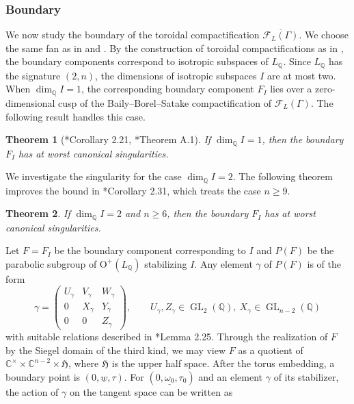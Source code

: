 \documentclass[11pt]{amsart}
\theoremstyle{plain}
\newtheorem{thm}{Theorem}[section]
\theoremstyle{definition}
\numberwithin{equation}{section}
\def\GL{\mathop{\mathrm{GL}}\nolimits}
\def\dim{\mathop{\mathrm{dim}}\nolimits}
\def\O{\mathrm{O}}
\newcommand{\bbC}{\mathbb{C}}
\newcommand{\bbQ}{\mathbb{Q}}
\newcommand{\calF}{\mathcal{F}}
\newcommand{\frakH}{\mathfrak{H}}
\begin{document}
\subsubsection{Boundary}
We now study the boundary of the toroidal compactification $\overline{\calF_L(\Gamma)}$.
We choose the same fan as in \cite{kondo1993kodaira} and \cite{Gritsenko2007kodaira}.
By the construction of toroidal compactifications as in \cite{ash2010smooth}, the boundary components correspond to isotropic subspaces of $L_\bbQ$. 
Since $L_\bbQ$ has the signature $(2,n)$, the dimensions of isotropic subspaces $I$ are at most two.
When $\dim_\bbQ I=1$, the corresponding boundary component $F_I$ lies over a zero-dimensional cusp of the Baily--Borel--Satake compactification of $\calF_L(\Gamma)$.
The following result handles this case.
\begin{thm}[{\cite{Gritsenko2007kodaira}*{Corollary 2.21}, \cite{ma2018kodaira}*{Theorem A.1}}]\label{thm_GHS_0_dim_cusp}
    If $\dim_\bbQ I = 1$, then the boundary $F_I$ has at worst canonical singularities.
\end{thm}
We investigate the singularity for the case  $\dim_\bbQ I = 2$.
The following theorem improves the bound in \cite{Gritsenko2007kodaira}*{Corollary 2.31}, which treats the case $n\geq9$.
\begin{thm}\label{thm_oethogonal_dim_1_cusp}
    If $\dim_\bbQ I = 2$ and $n \geq 6$, then the boundary $F_I$ has at worst canonical singularities.
\end{thm}
Let $F = F_I$ be the boundary component corresponding to $I$ and $P(F)$ be the parabolic subgroup of $\O^+(L_\bbQ)$ stabilizing $I$.
Any element $\gamma$ of $P(F)$ is of the form
\begin{equation}\label{eqn_gamma_P_I}
\gamma=
\begin{pmatrix}
    U_\gamma & V_\gamma & W_\gamma \\
    0 & X_\gamma & Y_\gamma\\
    0&0&Z_\gamma
\end{pmatrix}, \qquad  U_\gamma,Z_\gamma \in \GL_2(\bbQ),\ X_\gamma \in \GL_{n-2}(\bbQ)
\end{equation}
with suitable relations described in \cite{Gritsenko2007kodaira}*{Lemma 2.25}.
Through the realization of $F$ by the Siegel domain of the third kind, we may view $F$ as a quotient of $\bbC^\times \times \bbC^{n-2} \times \frakH$, where $\frakH$ is the upper half space.
After the torus embedding, a boundary point is $(0,\underline{w}, \tau)$.
For $(0,\underline{\omega_0},\tau_0)$ and an element $\gamma$ of its stabilizer, the action of $\gamma$ on the tangent space can be written as
\end{document}
